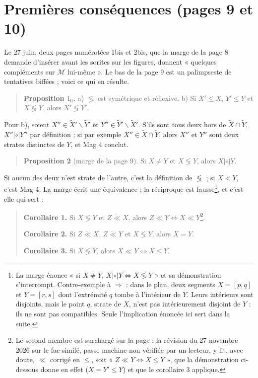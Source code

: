 \documentclass[11pt,a4paper]{article}
\begin{document}
\section*{Premières conséquences (pages 9 et 10)}

Le 27 juin, deux pages numérotées 1bis et 2bis, que la marge de la page 8
demande d'insérer avant les sorites sur les figures, donnent « quelques
compléments sur $\mathcal{M}$ lui-même ». Le bas de la page 9 est un
palimpseste de tentatives biffées ; voici ce qui en résulte.

\begin{quote}
\textbf{Proposition $1_{0}$.} a) $\lessgtr$ est symétrique et
réflexive. b) Si $X' \leq X$, $Y' \leq Y$ et $X \lessgtr Y$, alors $X' \lessgtr
Y'$.
\end{quote}

Pour b), soient $X'' \in \widetilde{X}' \smallsetminus \widetilde{Y}'$ et $Y''
\in \widetilde{Y}' \smallsetminus \widetilde{X}'$. S'ils sont tous deux hors de
$\widetilde{X} \cap \widetilde{Y}$, $X'' \mathrel{|\circ|} Y''$ par définition ;
si par exemple $X'' \in \widetilde{X} \cap \widetilde{Y}$, alors $X''$ et $Y''$
sont deux strates distinctes de $Y$, et Mag 4 conclut.

\begin{quote}
\textbf{Proposition 2} (marge de la page 9). Si $X \neq Y$ et $X \lessgtr Y$,
alors $X \mathrel{|\circ|} Y$.
\end{quote}

Si aucun des deux n'est strate de l'autre, c'est la définition de $\lessgtr$ ;
si $X < Y$, c'est Mag 4. La marge écrit une équivalence ; la réciproque est
fausse\footnote{La marge énonce « si $X \neq Y$, $X \mathrel{|\circ|} Y
\Leftrightarrow X \lessgtr Y$ » et sa démonstration s'interrompt. Contre-exemple
à $\Rightarrow$ : dans le plan, deux segments $X = [p,q]$ et $Y = [r,s]$ dont
l'extrémité $q$ tombe à l'intérieur de $Y$. Leurs intérieurs sont disjoints,
mais le point $q$, strate de $X$, n'est pas intérieurement disjoint de $Y$ : ils
ne sont pas compatibles. Seule l'implication énoncée ici sert dans la suite.},
et c'est elle qui sert :

\begin{quote}
\textbf{Corollaire 1.} Si $X \lessgtr Y$ et $Z \mathrel{\mathring{\ll}} X$,
alors $Z \ll Y \iff X \ll Y$\footnote{Le second membre est surchargé sur la
page : la révision du 27 novembre 2026 sur le fac-similé, passe machine non
vérifiée par un lecteur, y lit, avec doute, $\ll$ corrigé en $\leq$, soit « $Z
\ll Y \iff X \leq Y$ », que la démonstration ci-dessous donne en effet ($X = Y'
\leq Y$) et que le corollaire 3 applique.}.

\textbf{Corollaire 2.} Si $Z \mathrel{\mathring{\ll}} X$, $Z
\mathrel{\mathring{\ll}} Y$ et $X \lessgtr Y$, alors $X = Y$.

\textbf{Corollaire 3.} Si $X \lessgtr Y$, alors $X \ll Y \iff X \leq Y$.
\end{quote}
\end{document}
